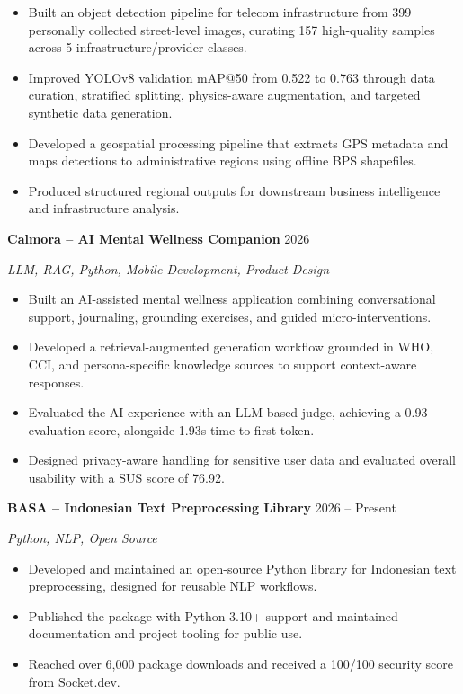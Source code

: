 \begin{itemize}
    \item Built an object detection pipeline for telecom infrastructure
    from 399 personally collected street-level images, curating 157
    high-quality samples across 5 infrastructure/provider classes.
    \item Improved YOLOv8 validation mAP@50 from 0.522 to 0.763 through
    data curation, stratified splitting, physics-aware augmentation,
    and targeted synthetic data generation.
    \item Developed a geospatial processing pipeline that extracts GPS
    metadata and maps detections to administrative regions using
    offline BPS shapefiles.
    \item Produced structured regional outputs for downstream business
    intelligence and infrastructure analysis.
\end{itemize}

\textbf{Calmora -- AI Mental Wellness Companion}
\hfill 2026

\textit{LLM, RAG, Python, Mobile Development, Product Design}

\begin{itemize}
    \item Built an AI-assisted mental wellness application combining
    conversational support, journaling, grounding exercises, and
    guided micro-interventions.
    \item Developed a retrieval-augmented generation workflow grounded
    in WHO, CCI, and persona-specific knowledge sources to support
    context-aware responses.
    \item Evaluated the AI experience with an LLM-based judge, achieving
    a 0.93 evaluation score, alongside 1.93s time-to-first-token.
    \item Designed privacy-aware handling for sensitive user data and
    evaluated overall usability with a SUS score of 76.92.
\end{itemize}

\textbf{BASA -- Indonesian Text Preprocessing Library}
\hfill 2026 -- Present

\textit{Python, NLP, Open Source}

\begin{itemize}
    \item Developed and maintained an open-source Python library for
    Indonesian text preprocessing, designed for reusable NLP workflows.
    \item Published the package with Python 3.10+ support and maintained
    documentation and project tooling for public use.
    \item Reached over 6,000 package downloads and received a 100/100
    security score from Socket.dev.
\end{itemize}